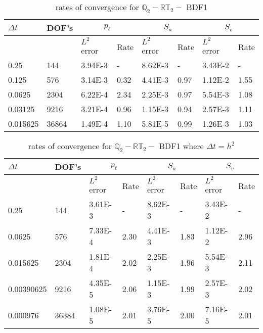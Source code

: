 \begin{table}[ht]
	\centering
	\begin{tabular}{|l|l|l|l|l|l|l|l|}
		\hline
		$\Delta t$ & DOF's & \multicolumn{2}{c|}{$p_{\ell}$} & \multicolumn{2}{c|}{$S_a$} & \multicolumn{2}{c|}{$S_v$}  \\ \hline
		& & $L^2$ error & Rate & $L^2$ error & Rate & $L^2$ error & Rate \\ \hline
		0.25   	  & 144   & 3.94E-3 & -	   & 8.62E-3 & -    & 3.43E-2 & - \\ \hline
		0.125     & 576   & 3.14E-3 & 0.32 & 4.41E-3 & 0.97 & 1.12E-2 & 1.55 \\ \hline
		0.0625    & 2304  & 6.22E-4 & 2.34 & 2.25E-3 & 0.97 & 5.54E-3 & 1.08 \\ \hline
		0.03125   & 9216  & 3.21E-4 & 0.96 & 1.15E-3 & 0.94 & 2.57E-3 & 1.11 \\ \hline 
		0.015625  & 36864 & 1.49E-4 & 1.10 & 5.81E-5 & 0.99 & 1.26E-3 & 1.03  \\ \hline
	\end{tabular}
	\caption[Template table-description for list of tables.]{ rates of convergence for $\mathbb{Q}_2 - \mathbb{RT}_2 -$ BDF1}
\end{table}

\begin{table}[ht]
	\centering
	\begin{tabular}{|l|l|l|l|l|l|l|l|}
		\hline
		$\Delta t$ & DOF's & \multicolumn{2}{c|}{$p_{\ell}$} & \multicolumn{2}{c|}{$S_a$} & \multicolumn{2}{c|}{$S_v$}  \\ \hline
		& & $L^2$ error & Rate & $L^2$ error & Rate & $L^2$ error & Rate \\ \hline
		0.25   	  & 144   & 3.61E-3 & -	   & 8.62E-3 & -    & 3.43E-2 & - \\ \hline
		0.0625    & 576   & 7.33E-4 & 2.30 & 4.41E-3 & 1.83 & 1.12E-2 & 2.96 \\ \hline
		0.015625  & 2304  & 1.81E-4 & 2.02 & 2.25E-3 & 1.96 & 5.54E-3 & 2.11 \\ \hline
		0.00390625& 9216  & 4.35E-5 & 2.06 & 1.15E-3 & 1.99 & 2.57E-3 & 2.02 \\ \hline 
		0.000976  & 36384 & 1.08E-5 & 2.01 & 3.76E-5 & 2.00 & 7.16E-5 & 2.01  \\ \hline
	\end{tabular}
	\caption[Template table-description for list of tables.]{ rates of convergence for $\mathbb{Q}_2 - \mathbb{RT}_2 -$ BDF1 where $\Delta t = h^2$ }
\end{table}

